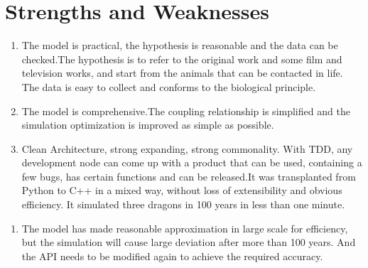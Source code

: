 \section{Strengths and Weaknesses}
\begin{enumerate}
    \item The model is practical, the hypothesis is reasonable and the data can be checked.The hypothesis is to refer to the original work and some film and television works, and start from the animals that can be contacted in life. The data is easy to collect and conforms to the biological principle.
    \item The model is comprehensive.The coupling relationship is simplified and the simulation optimization is improved as simple as possible.
    \item Clean Architecture, strong expanding, strong commonality. With TDD, any development node can come up with a product that can be used, containing a few bugs, has certain functions and can be released.It was transplanted from Python to C++ in a mixed way, without loss of extensibility and obvious efficiency. It simulated three dragons in 100 years in less than one minute.
\end{enumerate}
\noindent
{}
\begin{enumerate}
    \item The model has made reasonable approximation in large scale for efficiency, but the simulation will cause large deviation after more than 100 years. And the API needs to be modified again to achieve the required accuracy.
\end{enumerate}















